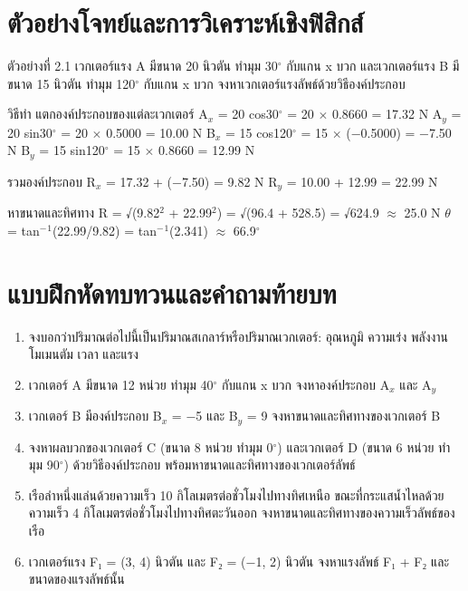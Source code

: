 \section{ตัวอย่างโจทย์และการวิเคราะห์เชิงฟิสิกส์}

\begin{examplebox}
ตัวอย่างที่ 2.1 เวกเตอร์แรง A มีขนาด 20 นิวตัน ทำมุม 30$^\circ$ กับแกน x บวก และเวกเตอร์แรง B มีขนาด 15 นิวตัน ทำมุม 120$^\circ$ กับแกน x บวก จงหาเวกเตอร์แรงลัพธ์ด้วยวิธีองค์ประกอบ

วิธีทำ แตกองค์ประกอบของแต่ละเวกเตอร์ A$_x$ = 20 cos30$^\circ$ = 20 $\times$ 0.8660 = 17.32 N A$_y$ = 20 sin30$^\circ$ = 20 $\times$ 0.5000 = 10.00 N B$_x$ = 15 cos120$^\circ$ = 15 $\times$ (−0.5000) = −7.50 N B$_y$ = 15 sin120$^\circ$ = 15 $\times$ 0.8660 = 12.99 N

รวมองค์ประกอบ R$_x$ = 17.32 + (−7.50) = 9.82 N R$_y$ = 10.00 + 12.99 = 22.99 N

หาขนาดและทิศทาง R = √(9.82$^2$ + 22.99$^2$) = √(96.4 + 528.5) = √624.9 $\approx$ 25.0 N $\theta$ = tan$^-$$^1$(22.99/9.82) = tan$^-$$^1$(2.341) $\approx$ 66.9$^\circ$
\end{examplebox}

\section{แบบฝึกหัดทบทวนและคำถามท้ายบท}

\begin{enumerate}
    \item จงบอกว่าปริมาณต่อไปนี้เป็นปริมาณสเกลาร์หรือปริมาณเวกเตอร์: อุณหภูมิ ความเร่ง พลังงาน โมเมนตัม เวลา และแรง
    \item เวกเตอร์ A มีขนาด 12 หน่วย ทำมุม 40$^\circ$ กับแกน x บวก จงหาองค์ประกอบ A$_x$ และ A$_y$
    \item เวกเตอร์ B มีองค์ประกอบ B$_x$ = −5 และ B$_y$ = 9 จงหาขนาดและทิศทางของเวกเตอร์ B
    \item จงหาผลบวกของเวกเตอร์ C (ขนาด 8 หน่วย ทำมุม 0$^\circ$) และเวกเตอร์ D (ขนาด 6 หน่วย ทำมุม 90$^\circ$) ด้วยวิธีองค์ประกอบ พร้อมหาขนาดและทิศทางของเวกเตอร์ลัพธ์
    \item เรือลำหนึ่งแล่นด้วยความเร็ว 10 กิโลเมตรต่อชั่วโมงไปทางทิศเหนือ ขณะที่กระแสน้ำไหลด้วยความเร็ว 4 กิโลเมตรต่อชั่วโมงไปทางทิศตะวันออก จงหาขนาดและทิศทางของความเร็วลัพธ์ของเรือ
    \item เวกเตอร์แรง F₁ = (3, 4) นิวตัน และ F₂ = (−1, 2) นิวตัน จงหาแรงลัพธ์ F₁ + F₂ และขนาดของแรงลัพธ์นั้น
\end{enumerate}

